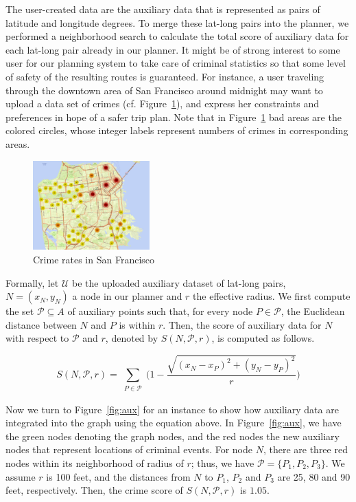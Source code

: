 \documentclass[letterpaper]{article}
\newcommand{\cU}{\mathcal{U}}
\newcommand{\cP}{\mathcal{P}}
\newcommand{\figref}[1]{Figure~\ref{fig:#1}}
\begin{document}
The user-created data are the auxiliary data that is represented as pairs
of latitude and longitude degrees.
To merge these lat-long pairs into the planner, we performed a neighborhood
search to calculate the total score of auxiliary data for each 
lat-long pair already in our planner.
It might be of strong interest to some user for our planning
system to take care of criminal statistics so that some level of safety
of the resulting routes is guaranteed.
For instance, a user traveling through the downtown area of San Francisco
around midnight may want to upload a data set of crimes (cf. \figref{sf_crime}), 
and express her constraints and preferences in hope of a safer trip plan.
Note that in \figref{sf_crime} bad areas are the colored circles, whose
integer labels represent numbers of crimes in corresponding areas.

\begin{figure}[!ht]
  \centering
    \includegraphics[width=0.4\textwidth]{figs/sub_sf_crime_July2015.png}
  \caption{Crime rates in San Francisco\label{fig:sf_crime}}
\end{figure}

Formally, let $\cU$ be the uploaded auxiliary dataset of lat-long pairs, 
$N=(x_N,y_N)$ a node in our planner and $r$ the effective radius.
We first compute the set $\cP \subseteq A$ of auxiliary points such that,
for every node $P \in \cP$, the Euclidean distance between $N$ and $P$
is within $r$.
Then, the score of auxiliary data for $N$ with respect to $\cP$ and $r$,
denoted by $S(N,\cP,r)$, is computed as follows.

\begin{equation*}
	S(N,\cP,r) = \sum_{\substack{P \in \cP}} 
		\Big(1 - \frac{\sqrt{(x_N-x_P)^2+(y_N-y_P)^2}}{r}\Big)
\end{equation*}

Now we turn to \figref{aux} for an instance to show how auxiliary data
are integrated into the graph using the equation above.
In \figref{aux}, we have the green nodes denoting the graph nodes, 
and the red nodes the new auxiliary nodes that represent locations
of criminal events.
For node $N$, there are three red nodes within its neighborhood of
radius of $r$; thus, we have $\cP=\{P_1,P_2,P_3\}$.
We assume $r$ is 100 feet, and the distances from $N$ to $P_1$,
$P_2$ and $P_3$ are 25, 80 and 90 feet, respectively.
Then, the crime score of $S(N,\cP,r)$ is $1.05$.
\end{document}
